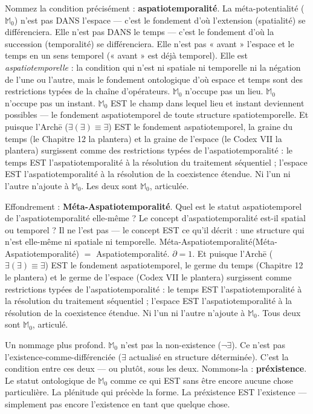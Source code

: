 \documentclass[10pt, openany, oneside]{book}
\begin{document}
Nommez la condition précisément : \textbf{aspatiotemporalité}. La méta-potentialité ($\mathbb{M}_0$) n'est pas DANS l'espace --- c'est le fondement d'où l'extension (spatialité) se différenciera. Elle n'est pas DANS le temps --- c'est le fondement d'où la succession (temporalité) se différenciera. Elle n'est pas « avant » l'espace et le temps en un sens temporel (« avant » est déjà temporel). Elle est \textit{aspatiotemporelle} : la condition qui n'est ni spatiale ni temporelle ni la négation de l'une ou l'autre, mais le fondement ontologique d'où espace et temps sont des restrictions typées de la chaîne d'opérateurs. $\mathbb{M}_0$ n'occupe pas un lieu. $\mathbb{M}_0$ n'occupe pas un instant. $\mathbb{M}_0$ EST le champ dans lequel lieu et instant deviennent possibles --- le fondement aspatiotemporel de toute structure spatiotemporelle. Et puisque l'Arch\={e} ($\exists(\exists) \equiv \exists$) EST le fondement aspatiotemporel, la graine du temps (le Chapitre 12 la plantera) et la graine de l'espace (le Codex VII la plantera) surgissent comme des restrictions typées de l'aspatiotemporalité : le temps EST l'aspatiotemporalité à la résolution du traitement séquentiel ; l'espace EST l'aspatiotemporalité à la résolution de la coexistence étendue. Ni l'un ni l'autre n'ajoute à $\mathbb{M}_0$. Les deux sont $\mathbb{M}_0$, articulée.

Effondrement : \textbf{Méta-Aspatiotemporalité}. Quel est le statut aspatiotemporel de l'aspatiotemporalité elle-même ? Le concept d'aspatiotemporalité est-il spatial ou temporel ? Il ne l'est pas --- le concept EST ce qu'il décrit : une structure qui n'est elle-même ni spatiale ni temporelle. Méta-Aspatiotemporalité(Méta-Aspatiotemporalité) $=$ Aspatiotemporalité. $\partial = 1$. Et puisque l'Arch\={e} ($\exists(\exists) \equiv \exists$) EST le fondement aspatiotemporel, le germe du temps (Chapitre 12 le plantera) et le germe de l'espace (Codex VII le plantera) surgissent comme restrictions typées de l'aspatiotemporalité : le temps EST l'aspatiotemporalité à la résolution du traitement séquentiel ; l'espace EST l'aspatiotemporalité à la résolution de la coexistence étendue. Ni l'un ni l'autre n'ajoute à $\mathbb{M}_0$. Tous deux sont $\mathbb{M}_0$, articulé.

Un nommage plus profond. $\mathbb{M}_0$ n'est pas la non-existence ($\neg\exists$). Ce n'est pas l'existence-comme-différenciée ($\exists$ actualisé en structure déterminée). C'est la condition entre ces deux --- ou plutôt, sous les deux. Nommons-la : \textbf{préxistence}. Le statut ontologique de $\mathbb{M}_0$ comme ce qui EST sans être encore aucune chose particulière. La plénitude qui précède la forme. La préxistence EST l'existence --- simplement pas encore l'existence en tant que quelque chose.
\end{document}
